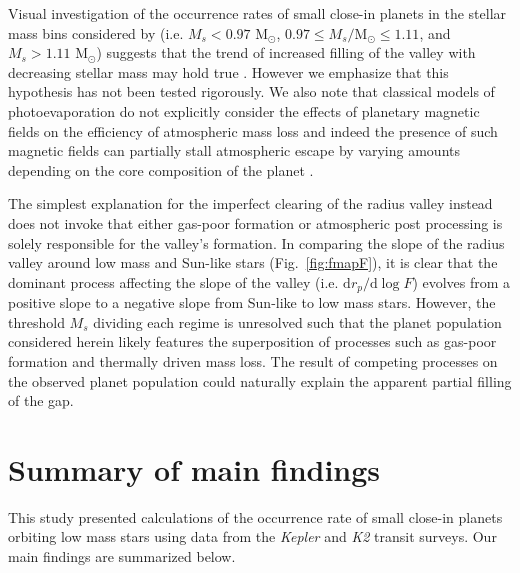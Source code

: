 \documentclass[twocolumn]{emulateapj}
\newcommand{\kepler}[1]{\emph{Kepler}#1}
\newcommand{\ktwo}[1]{\emph{K2}#1}
\begin{document}
Visual
investigation of the occurrence rates of small close-in planets in the stellar mass bins considered by
\citealt{fulton18} (i.e. $M_s<0.97$ M$_{\odot}$, $0.97 \leq M_s/\text{M}_{\odot} \leq 1.11$, and $M_s>1.11$ M$_{\odot}$)
suggests that the trend of increased filling of the valley with decreasing stellar mass may hold true   
\citep[c.f. Fig. 9;][]{fulton18}. However we emphasize that this hypothesis has not been tested rigorously.   
We also note that classical models of photoevaporation do not explicitly consider the effects of
planetary magnetic fields on the efficiency of atmospheric mass loss and indeed the presence of such magnetic
fields can partially stall atmospheric escape by varying amounts depending on the core composition of the
planet \citep{owen19}.

The simplest explanation for the imperfect clearing of the radius valley instead does not invoke that either
gas-poor formation or atmospheric post processing is solely responsible for the valley's formation.
In comparing the slope of the radius valley around low mass and Sun-like stars (Fig.~\ref{fig:fmapF}), it is
clear that the dominant process affecting the slope of the valley (i.e. $\text{d}r_p/\text{d}\log{F}$)
evolves from a positive slope to a negative slope from Sun-like to low mass stars. However,
the threshold $M_s$ dividing each regime is unresolved such that the planet population considered herein
likely features the superposition of processes such as gas-poor formation and thermally driven mass loss. The
result of competing processes on the observed planet population could naturally explain the apparent
partial filling of the gap.


\section{Summary of main findings} \label{sect:conclusions}
This study presented calculations of the occurrence rate of small close-in planets orbiting low mass stars
using data from the \kepler{} and \ktwo{} transit surveys. Our main findings are summarized below.
\end{document}
